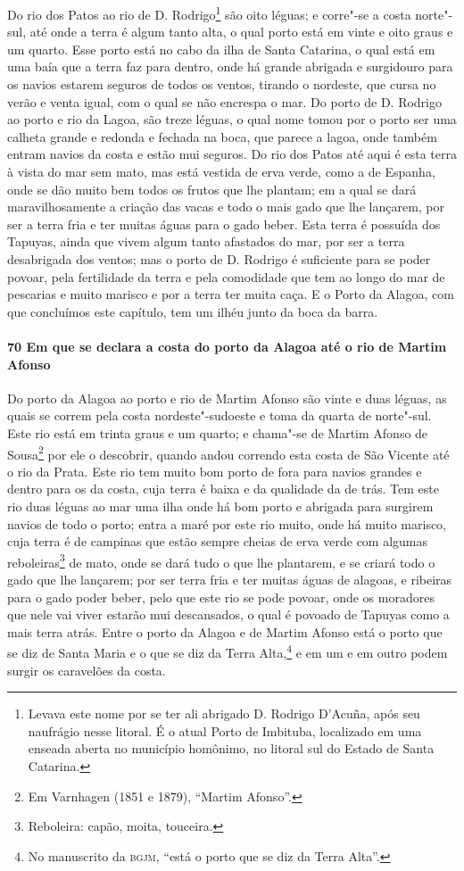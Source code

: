 Do rio dos Patos ao rio de D. Rodrigo\footnote{ Levava este nome por se ter ali abrigado
D. Rodrigo D’Acuña, após seu naufrágio nesse litoral. É o atual Porto de Imbituba,
localizado em uma enseada aberta no município homônimo, no litoral sul do Estado de Santa
Catarina.} são oito léguas; e corre"-se a costa norte"-sul, até onde a terra é algum tanto
alta, o qual porto está em vinte e oito graus e um quarto. Esse porto está no cabo da ilha
de Santa Catarina, o qual está em uma baía que a terra faz para dentro, onde há grande
abrigada e surgidouro para os navios estarem seguros de todos os ventos, tirando o
nordeste, que cursa no verão e venta igual, com o qual se não encrespa o mar. Do porto de
D. Rodrigo ao porto e rio da Lagoa, são treze léguas, o qual nome tomou por o porto ser
uma calheta grande e redonda e fechada na boca, que parece a lagoa, onde também entram
navios da costa e estão mui seguros. Do rio dos Patos até aqui é esta terra à vista do mar
sem mato, mas está vestida de erva verde, como a de Espanha, onde se dão muito bem todos
os frutos que lhe plantam; em a qual se dará maravilhosamente a criação das vacas e todo o
mais gado que lhe lançarem, por ser a terra fria e ter muitas águas para o gado beber.
Esta terra é possuída dos Tapuyas, ainda que vivem algum tanto afastados do mar, por ser a
terra desabrigada dos ventos; mas o porto de D. Rodrigo é suficiente para se poder povoar,
pela fertilidade da terra e pela comodidade que tem ao longo do mar de pescarias e muito
marisco e por a terra ter muita caça. E o Porto da Alagoa, com que concluímos este
capítulo, tem um ilhéu junto da boca da barra.

\paragraph{70 Em que se declara a costa do porto da Alagoa até o rio de Martim Afonso}

Do porto da Alagoa ao porto e rio de Martim Afonso são vinte e duas léguas, as quais se
correm pela costa nordeste"-sudoeste e toma da quarta de norte"-sul. Este rio está em trinta
graus e um quarto; e chama"-se de Martim Afonso de Sousa\footnote{ Em Varnhagen (1851 e
1879), ``Martim Afonso''.} por ele o descobrir, quando andou correndo esta costa de São
Vicente até o rio da Prata. Este rio tem muito bom porto de fora para navios grandes e
dentro para os da costa, cuja terra é baixa e da qualidade da de trás. Tem este rio duas
léguas ao mar uma ilha onde há bom porto e abrigada para surgirem navios de todo o porto;
entra a maré por este rio muito, onde há muito marisco, cuja terra é de campinas que estão
sempre cheias de erva verde com algumas reboleiras\footnote{ Reboleira: capão, moita,
touceira.} de mato, onde se dará tudo o que lhe plantarem, e se criará todo o gado que lhe
lançarem; por ser terra fria e ter muitas águas de alagoas, e ribeiras para o gado poder
beber, pelo que este rio se pode povoar, onde os moradores que nele vai viver estarão mui
descansados, o qual é povoado de Tapuyas como a mais terra atrás. Entre o porto da Alagoa
e de Martim Afonso está o porto que se diz de Santa Maria e o que se diz da Terra
Alta,\footnote{ No manuscrito da \textsc{bgjm}, ``está o porto que se diz da Terra
Alta''.} e em um e em outro podem surgir os caravelões da costa.

